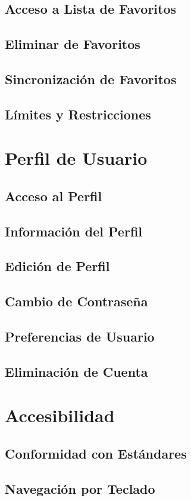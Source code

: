 \documentclass[11pt,a4paper,twoside]{book}
\begin{document}
\section{Acceso a Lista de Favoritos}
\section{Eliminar de Favoritos}
\section{Sincronización de Favoritos}
\section{Límites y Restricciones}

\chapter{Perfil de Usuario}
\section{Acceso al Perfil}
\section{Información del Perfil}
\section{Edición de Perfil}
\section{Cambio de Contraseña}
\section{Preferencias de Usuario}
\section{Eliminación de Cuenta}

\chapter{Accesibilidad}
\section{Conformidad con Estándares}
\section{Navegación por Teclado}
\end{document}
